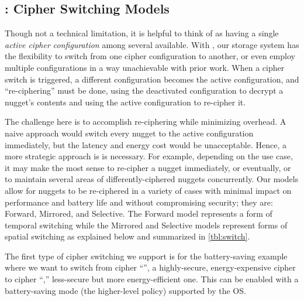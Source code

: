 \subsection{\sysA: Cipher Switching Models}\label{subsec:des-switch}

Though not a technical limitation, it is helpful to think of \sys as having a
single {\em active cipher configuration} among several available. With \sysA,
our storage system has the flexibility to switch from one cipher configuration
to another, or even employ multiple configurations in a way unachievable with
prior work. When a cipher switch is triggered, a different configuration becomes
the active configuration, and ``re-ciphering'' must be done, \ie using the
deactivated configuration to decrypt a nugget's contents and using the active
configuration to re-cipher it.

The challenge here is to accomplish re-ciphering while minimizing overhead. A
naive approach would switch every nugget to the active configuration
immediately, but the latency and energy cost would be unacceptable. Hence, a
more strategic approach is is necessary. For example, depending on the use case,
it may make the most sense to re-cipher a nugget immediately, or eventually, or
to maintain several areas of differently-ciphered nuggets concurrently. Our
models allow for nuggets to be re-ciphered in a variety of cases with minimal
impact on performance and battery life and without compromising security; they
are: Forward, Mirrored, and Selective. The Forward model represents a form of
temporal switching while the Mirrored and Selective models represent forms of
spatial switching as explained below and summarized in \cref{tbl:switch}.




 The first type of cipher switching we support is for
the battery-saving example where we want to switch from cipher ``\cone'', a
highly-secure, energy-expensive cipher to cipher ``\ctwo,'' less-secure but more
energy-efficient one. This can be enabled with a battery-saving mode (the
higher-level policy) supported by the OS.

